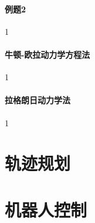 \documentclass[
12pt, %
a4paper, 
oneside, %
headinclude,footinclude, %
]{scrartcl}
\begin{document}
{\paragraph{例题2}
1
\paragraph{牛顿-欧拉动力学方程法}
1
\paragraph{拉格朗日动力学法}
1
}
\section{轨迹规划}
\section{机器人控制}
\end{document}

